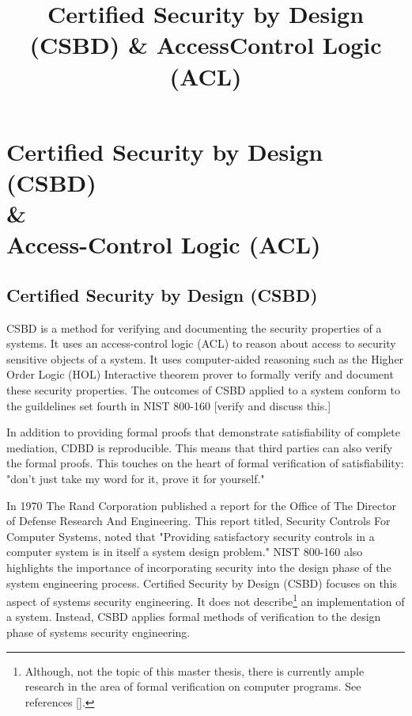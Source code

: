 \documentclass[../../main/main.tex]{subfiles}
\begin{document}
\title{Certified Security by Design (CSBD) \& Access\-Control Logic (ACL)}

\chapter[Certified Security by Design (CSBD) \& Access-Control Logic (ACL)]{Certified Security by Design (CSBD)  \\ \& \\ Access-Control Logic (ACL)} \label{chp:csbdacl}


\section{Certified Security by Design (CSBD)} \label{sec:csbd}
CSBD is a method for verifying and documenting the security properties of a systems.  It uses an access-control logic (ACL) to reason about access to security sensitive objects of a system.  It uses computer-aided reasoning such as the Higher Order Logic (HOL) Interactive theorem prover to formally verify and document these security properties.  The outcomes of CSBD applied to a system conform to the guildelines set fourth in NIST 800-160 [verify and discuss this.]

In addition to providing formal proofs that demonstrate satisfiability of complete mediation, CDBD is reproducible.  This means that third parties can also verify the formal proofs. This touches on the heart of formal verification of satisfiability: "don't just take my word for it, prove it for yourself."

In 1970 The Rand Corporation published a report\cite{defensescienceboard} for the Office of The Director of Defense Research And Engineering.  This report titled, Security Controls For Computer Systems, noted that "Providing satisfactory security controls in a computer system is in itself a system design problem."  NIST 800-160 also highlights the importance of incorporating security into the design phase of the system engineering process.  Certified Security by Design (CSBD) focuses on this aspect of systems security engineering.  It does not describe\footnote{Although, not the topic of this master thesis, there is currently ample research in the area of formal verification on computer programs.  See references []. } an implementation of a system.  Instead, CSBD applies formal methods of verification to the design phase of systems security engineering.  
\end{document}

